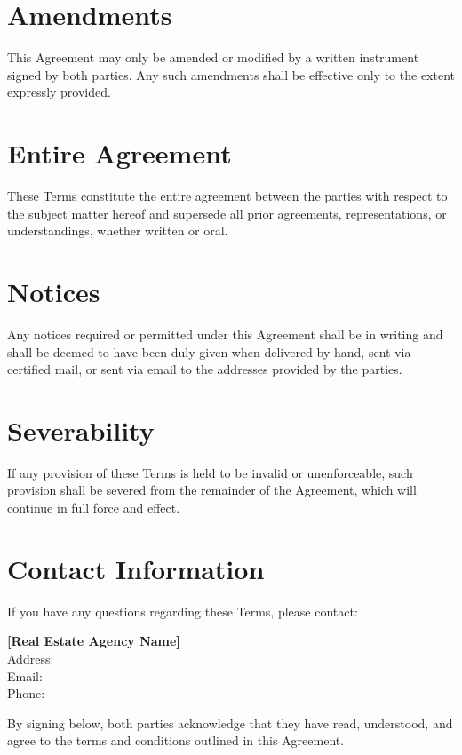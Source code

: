 \documentclass[12pt]{article}
\begin{document}
\section{Amendments}
This Agreement may only be amended or modified by a written instrument signed by both parties. Any such amendments shall be effective only to the extent expressly provided.

\section{Entire Agreement}
These Terms constitute the entire agreement between the parties with respect to the subject matter hereof and supersede all prior agreements, representations, or understandings, whether written or oral.

\section{Notices}
Any notices required or permitted under this Agreement shall be in writing and shall be deemed to have been duly given when delivered by hand, sent via certified mail, or sent via email to the addresses provided by the parties.

\section{Severability}
If any provision of these Terms is held to be invalid or unenforceable, such provision shall be severed from the remainder of the Agreement, which will continue in full force and effect.

\section{Contact Information}
If you have any questions regarding these Terms, please contact:
\begin{center}
    \textbf{[Real Estate Agency Name]}\\[0.2cm]
    Address: \underline{\hspace{5cm}}\\[0.2cm]
    Email: \underline{\hspace{5cm}}\\[0.2cm]
    Phone: \underline{\hspace{5cm}}
\end{center}

\bigskip

\noindent By signing below, both parties acknowledge that they have read, understood, and agree to the terms and conditions outlined in this Agreement.
\end{document}
